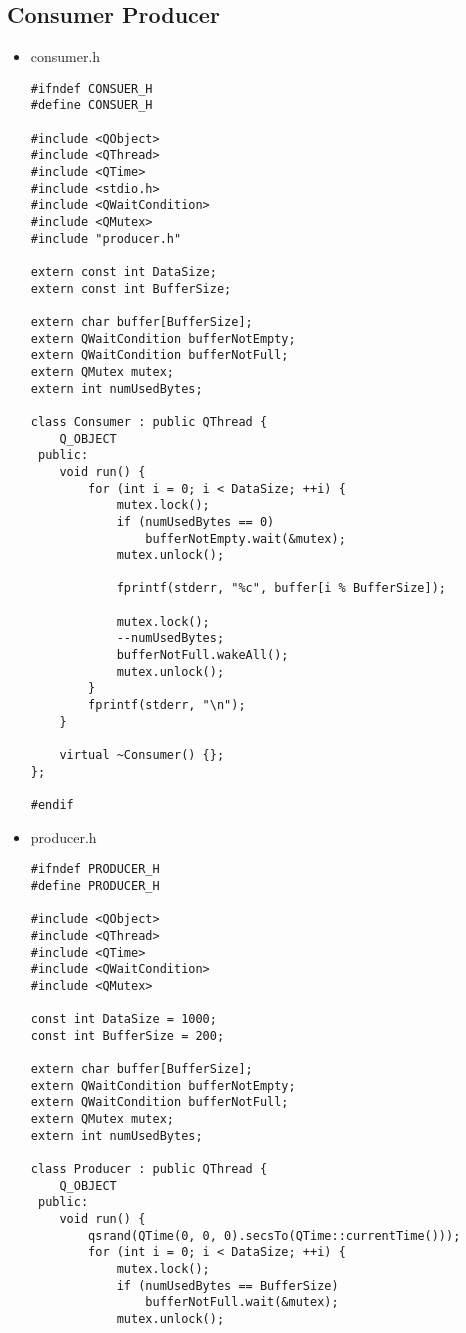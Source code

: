 \documentclass[9pt,b5paper]{article}
\begin{document}
\subsection{Consumer Producer}
\label{sec-6-3}
\begin{itemize}
\item consumer.h
\lstset{language=java,label= ,caption= ,numbers=none}
\begin{lstlisting}
#ifndef CONSUER_H
#define CONSUER_H

#include <QObject>
#include <QThread>
#include <QTime>
#include <stdio.h>
#include <QWaitCondition>
#include <QMutex>
#include "producer.h"

extern const int DataSize;
extern const int BufferSize;

extern char buffer[BufferSize];
extern QWaitCondition bufferNotEmpty;
extern QWaitCondition bufferNotFull;
extern QMutex mutex;
extern int numUsedBytes;

class Consumer : public QThread {
    Q_OBJECT
 public:
    void run() {
        for (int i = 0; i < DataSize; ++i) {
            mutex.lock();
            if (numUsedBytes == 0)
                bufferNotEmpty.wait(&mutex);
            mutex.unlock();

            fprintf(stderr, "%c", buffer[i % BufferSize]);

            mutex.lock();
            --numUsedBytes;
            bufferNotFull.wakeAll();
            mutex.unlock();
        }
        fprintf(stderr, "\n");
    }

    virtual ~Consumer() {};
};

#endif
\end{lstlisting}
\item producer.h
\lstset{language=java,label= ,caption= ,numbers=none}
\begin{lstlisting}
#ifndef PRODUCER_H
#define PRODUCER_H

#include <QObject>
#include <QThread>
#include <QTime>
#include <QWaitCondition>
#include <QMutex>

const int DataSize = 1000;
const int BufferSize = 200;

extern char buffer[BufferSize];
extern QWaitCondition bufferNotEmpty;
extern QWaitCondition bufferNotFull;
extern QMutex mutex;
extern int numUsedBytes;

class Producer : public QThread {
    Q_OBJECT
 public:
    void run() {
        qsrand(QTime(0, 0, 0).secsTo(QTime::currentTime()));
        for (int i = 0; i < DataSize; ++i) {
            mutex.lock();
            if (numUsedBytes == BufferSize)
                bufferNotFull.wait(&mutex);
            mutex.unlock();


\end{lstlisting}
\end{itemize}
\end{document}

